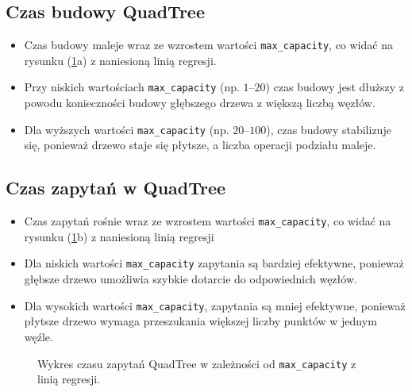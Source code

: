 \documentclass[12pt]{article}
\begin{document}
\subsection{Czas budowy QuadTree}
\begin{itemize}
    \item Czas budowy maleje wraz ze wzrostem wartości \texttt{max\_capacity}, co widać na rysunku (\ref{fig:max_cap}a) z naniesioną linią regresji.
    \item Przy niskich wartościach \texttt{max\_capacity} (np. \( 1 \)–\( 20 \)) czas budowy jest dłuższy z powodu konieczności budowy głębszego drzewa z większą liczbą węzłów.
    \item Dla wyższych wartości \texttt{max\_capacity} (np. \( 20 \)–\( 100 \)), czas budowy stabilizuje się, ponieważ drzewo staje się płytsze, a liczba operacji podziału maleje.
\end{itemize}


\subsection{Czas zapytań w QuadTree}
\begin{itemize}
    \item Czas zapytań rośnie wraz ze wzrostem wartości \texttt{max\_capacity}, co widać na rysunku (\ref{fig:max_cap}b) z naniesioną linią regresji
    \item Dla niskich wartości \texttt{max\_capacity} zapytania są bardziej efektywne, ponieważ głębsze drzewo umożliwia szybkie dotarcie do odpowiednich węzłów.
    \item Dla wysokich wartości \texttt{max\_capacity}, zapytania są mniej efektywne, ponieważ płytsze drzewo wymaga przeszukania większej liczby punktów w jednym węźle.
\end{itemize}


\begin{figure}[h]
    \centering
    \qquad
    \caption{Wykres czasu zapytań QuadTree w zależności od \texttt{max\_capacity} z linią regresji.}%
    \label{fig:max_cap}%
\end{figure}
\end{document}
